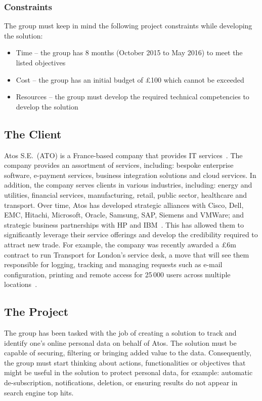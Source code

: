 \subsubsection{Constraints}

The group must keep in mind the following project constraints while developing the solution:

\begin{itemize}
	\item Time – the group has 8 months (October 2015 to May 2016) to meet the listed objectives
	\item Cost – the group has an initial budget of £100 which cannot be exceeded
	\item Resources – the group must develop the required technical competencies to develop the solution
\end{itemize}

\subsection{The Client}

Atos S.E.~(ATO) is a France-based company that provides IT services~\parencite{web:reuters}. The company provides an assortment of services, including: bespoke enterprise software, e-payment services, business integration solutions and cloud services. In addition, the company serves clients in various industries, including: energy and utilities, financial services, manufacturing, retail, public sector, healthcare and transport. Over time, Atos has developed strategic alliances with Cisco, Dell, EMC, Hitachi, Microsoft, Oracle, Samsung, SAP, Siemens and VMWare; and strategic business partnerships with HP and IBM~\parencite{web:bloomberg}. This has allowed them to significantly leverage their service offerings and develop the credibility required to attract new trade. For example, the company was recently awarded a \pounds 6m contract to run Transport for London's service desk, a move that will see them responsible for logging, tracking and managing requests such as e-mail configuration, printing and remote access for 25\,000 users across multiple locations~\parencite{web:jee}.

\subsection{The Project}

The group has been tasked with the job of creating a solution to track and identify one’s online personal data on behalf of Atos. The solution must be capable of securing, filtering or bringing added value to the data. Consequently, the group must start thinking about actions, functionalities or objectives that might be useful in the solution to protect personal data, for example: automatic de-subscription, notifications, deletion, or ensuring results do not appear in search engine top hits.

